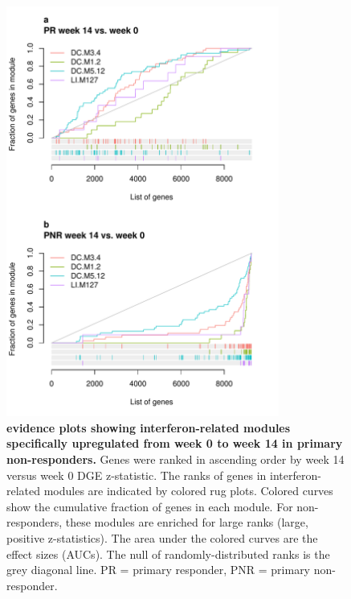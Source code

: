 \begin{figure}
    \centering
    \includegraphics[width=0.8\textwidth,page=1]{mainmatter/figures/chapter_04/plot_gene_set_enrichment.evidencePlots_C_3_1_Interferon.pdf}
    \caption{
        \textbf{ evidence plots showing interferon-related modules specifically upregulated from week 0 to week 14 in primary non-responders.}
        Genes were ranked in ascending order by week 14 versus week 0 \gls{DGE} z-statistic. 
        The ranks of genes in interferon-related modules are indicated by colored rug plots. 
        Colored curves show the cumulative fraction of genes in each module. 
        For non-responders, these modules are enriched for large ranks (large, positive z-statistics). 
        The area under the colored curves are the effect sizes (\glspl{AUC}). 
        The null of randomly-distributed ranks is the grey diagonal line.
        PR = primary responder, PNR = primary non-responder.
    }
    \label{fig:multipants_dge_evidencePlots_C_3_1_Interferon}
\end{figure}

